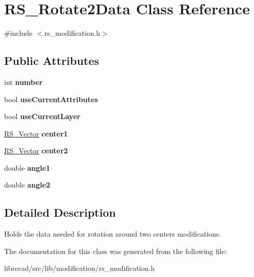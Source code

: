 \hypertarget{classRS__Rotate2Data}{\section{R\-S\-\_\-\-Rotate2\-Data Class Reference}
\label{classRS__Rotate2Data}
}


{\ttfamily \#include $<$rs\-\_\-modification.\-h$>$}

\subsection*{Public Attributes}
\begin{DoxyCompactItemize}
\item 
\hypertarget{classRS__Rotate2Data_abf3d47b118882b69317f0ab679457ce2}{int {\bfseries number}}\label{classRS__Rotate2Data_abf3d47b118882b69317f0ab679457ce2}

\item 
\hypertarget{classRS__Rotate2Data_a622a806f043a79f69ed5a42e0b239d5a}{bool {\bfseries use\-Current\-Attributes}}\label{classRS__Rotate2Data_a622a806f043a79f69ed5a42e0b239d5a}

\item 
\hypertarget{classRS__Rotate2Data_ab3e563bfef3ae8377b128692474fd08a}{bool {\bfseries use\-Current\-Layer}}\label{classRS__Rotate2Data_ab3e563bfef3ae8377b128692474fd08a}

\item 
\hypertarget{classRS__Rotate2Data_a85d67626bd0d49a4809ae19473f7f860}{\hyperlink{classRS__Vector}{R\-S\-\_\-\-Vector} {\bfseries center1}}\label{classRS__Rotate2Data_a85d67626bd0d49a4809ae19473f7f860}

\item 
\hypertarget{classRS__Rotate2Data_a432f99b0747b38e17e57136bb9ece7a7}{\hyperlink{classRS__Vector}{R\-S\-\_\-\-Vector} {\bfseries center2}}\label{classRS__Rotate2Data_a432f99b0747b38e17e57136bb9ece7a7}

\item 
\hypertarget{classRS__Rotate2Data_a1446a14850021cae59e5bc58987b65a5}{double {\bfseries angle1}}\label{classRS__Rotate2Data_a1446a14850021cae59e5bc58987b65a5}

\item 
\hypertarget{classRS__Rotate2Data_a48bb77ea71cee716b5a37a0492eabc97}{double {\bfseries angle2}}\label{classRS__Rotate2Data_a48bb77ea71cee716b5a37a0492eabc97}

\end{DoxyCompactItemize}


\subsection{Detailed Description}
Holds the data needed for rotation around two centers modifications. 

The documentation for this class was generated from the following file\-:\begin{DoxyCompactItemize}
\item 
librecad/src/lib/modification/rs\-\_\-modification.\-h\end{DoxyCompactItemize}
